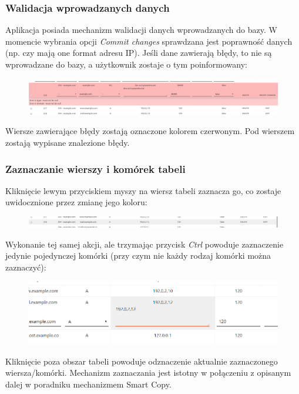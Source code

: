\documentclass[12pt] {article}
\begin{document}
\subsubsection{Walidacja wprowadzanych danych}
Aplikacja posiada mechanizm walidacji danych wprowadzanych do bazy. W momencie wybrania opcji \emph{Commit changes} sprawdzana jest poprawność danych (np. czy mają one format adresu IP). Jeśli dane zawierają błędy, to nie są wprowadzane do bazy, a użytkownik zostaje o tym poinformowany:
\begin{figure}[H]
\centering
\includegraphics[width=\textwidth]{res/13_tabela_niepoprawny}
\end{figure}
Wiersze zawierające błędy zostają oznaczone kolorem czerwonym. Pod wierszem zostają wypisane znalezione błędy. 

\subsubsection{Zaznaczanie wierszy i komórek tabeli}
Kliknięcie lewym przyciskiem myszy na wiersz tabeli zaznacza go, co zostaje uwidocznione przez zmianę jego koloru:
\begin{figure}[H]
\centering
\includegraphics[width=\textwidth]{res/14_tabela_zaznaczenie_wiersz}
\end{figure}
Wykonanie tej samej akcji, ale trzymając przycisk \emph{Ctrl} powoduje zaznaczenie jedynie pojedynczej komórki (przy czym nie każdy rodzaj komórki można zaznaczyć):
\begin{figure}[H]
\centering
\includegraphics[width=\textwidth]{res/15_tabela_zaznaczenie_pojedyncze}
\end{figure}
Kliknięcie poza obszar tabeli powoduje odznaczenie aktualnie zaznaczonego wiersza/komórki.
Mechanizm zaznaczania jest istotny w połączeniu z opisanym dalej w poradniku mechanizmem Smart Copy. 
\end{document}
